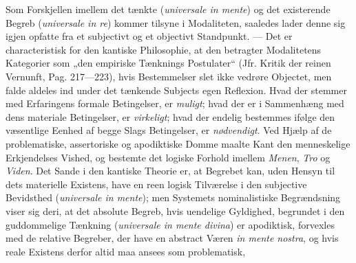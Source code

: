 \documentclass[12pt]{book}
\newcommand{\opage}[1]{\marginnote{\footnotesize\textit{[#1]}}}
\begin{document}
Som Forskjellen imellem det tænkte (\textit{universale in mente}) og det
existerende Begreb (\textit{universale in re}) kommer tilsyne i Modaliteten,
saaledes lader denne sig igjen opfatte fra et subjectivt og et objectivt
Standpunkt. --- Det er characteristisk for den kantiske Philosophie, at den
betragter Modalitetens Kategorier som „den empiriske Tænknings Postulater“ (Jfr.
Kritik der reinen Vernunft, Pag. 217---223), hvis Bestemmelser slet ikke vedrøre
Objectet, men falde aldeles ind under det tænkende Subjects egen Reflexion. Hvad
der stemmer med Erfaringens formale Betingelser, er \emph{muligt}; hvad der er i
Sammenhæng med dens materiale Betingelser, er \emph{virkeligt}; hvad der endelig
bestemmes ifølge den væsentlige Eenhed af begge Slags Betingelser, er
\emph{nødvendigt}. Ved Hjælp af de problematiske, assertoriske og apodiktiske
Domme maalte Kant den menneskelige Erkjendelses Vished, og bestemte det logiske
Forhold imellem \emph{Menen}, \emph{Tro} og \emph{Viden}. Det Sande i den kantiske
Theorie er, at Begrebet kan, uden Hensyn til dets materielle Existens, have en
reen logisk Tilværelse i den subjective Bevidsthed (\textit{universale in mente});
men Systemets nominalistiske Begrændsning viser sig deri, at det absolute Begreb,
hvis uendelige Gyldighed, begrundet
\opage{55} i den guddommelige Tænkning (\textit{universale in mente divina}) er apodiktisk,
forvexles med de relative Begreber, der have en abstract Væren \textit{in mente
nostra}, og hvis reale Existens derfor altid maa ansees som problematisk,
\end{document}
